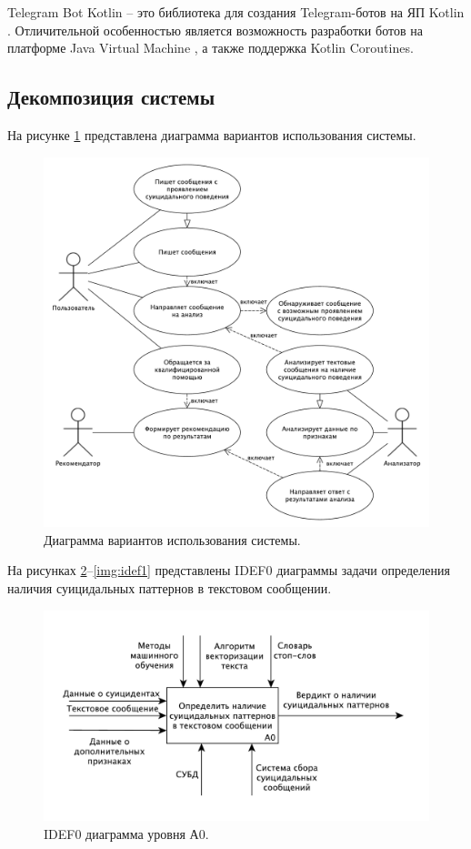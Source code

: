 Telegram Bot Kotlin -- это библиотека для создания Telegram-ботов на ЯП Kotlin \cite{Kotlin}. Отличительной особенностью является возможность разработки ботов на платформе Java Virtual Machine \cite{jvm}, а также поддержка Kotlin Coroutines. \cite{kotlinTelegram}

\subsection{Декомпозиция системы}

На рисунке \ref{img:useCase} представлена диаграмма вариантов использования системы.

\begin{figure}[H]
	\centering
	\includegraphics[width=\textwidth]{inc/useCase.pdf}
	\caption{ Диаграмма вариантов использования системы. }
	\label{img:useCase}
\end{figure}

На рисунках \ref{img:idef0}--\ref{img:idef1} представлены IDEF0 диаграммы задачи определения наличия суицидальных паттернов в текстовом сообщении.


\begin{figure}[H]
	\centering
	\includegraphics[width=\textwidth]{inc/A0.pdf}
	\caption{ IDEF0 диаграмма уровня А0. }
	\label{img:idef0}
\end{figure}

